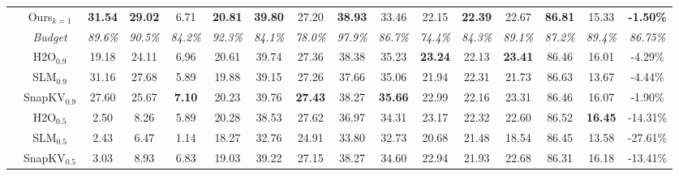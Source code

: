 \begin{table*}[!t]
{\begin{tabular}{c|ccccccccccccccc}
          & \cellcolor{teal!20}Ours$_{k=1}$                     & \cellcolor{teal!20}\textbf{31.54}&\cellcolor{teal!20}\textbf{29.02}& \cellcolor{teal!20}6.71& \cellcolor{teal!20}\textbf{20.81} & \cellcolor{teal!20}\textbf{39.80}                 & \cellcolor{teal!20}27.20              & \cellcolor{teal!20}\textbf{38.93}             &    \cellcolor{teal!20}33.46             & \cellcolor{teal!20}22.15          & \cellcolor{teal!20}\textbf{22.39}         & \cellcolor{teal!20}22.67                       &     \cellcolor{teal!20}\textbf{86.81}                    &   \cellcolor{teal!20}15.33  &\cellcolor{teal!20}\textbf{-1.50\%} \\
          & \cellcolor{pink!30}\textit{Budget}              & \cellcolor{pink!30}\textit{89.6\%} &\cellcolor{pink!30}\textit{90.5\%}&\cellcolor{pink!30}\textit{84.2\%}& \cellcolor{pink!30}\textit{92.3\%} &\cellcolor{pink!30}\textit{84.1\%}                & \cellcolor{pink!30}\textit{78.0\%}              & \cellcolor{pink!30}\textit{97.9\%}             &     \cellcolor{pink!30}\textit{86.7\%}            & \cellcolor{pink!30}\textit{74.4\%}         &\cellcolor{pink!30}\textit{84.3\%}         & \cellcolor{pink!30}\textit{89.1\%}                    &      \cellcolor{pink!30}\textit{87.2\%}          &  \cellcolor{pink!30}\textit{89.4\%}   &\cellcolor{pink!30}\textit{86.75\%} \\
          & H2O$_{0.9}$                      & 19.18  &  24.11  &   6.96 &       20.61      &   39.74  &    27.36              &  38.38                 &        35.23         &       \textbf{23.24}         & 22.13              &             \textbf{23.41}            &     86.46                       &  16.01   &-4.29\% \\
          & SLM$_{0.9}$          &        31.16     & 27.68 &   5.89       &   19.88          & 39.15  &  27.26                  &       37.66            &      35.06           &   21.94       &    22.31             &         21.73                    & 86.63   &13.67  &-4.44\%\\
          & SnapKV$_{0.9}$                   & 27.60 &  25.67   &   \textbf{7.10}     &     20.23      &  39.76 &    \textbf{27.43}                &    38.27               &       \textbf{35.66}                          &    22.99           &           22.16        &    23.31                            &   86.46        &  16.07   &-1.90\% \\ 
    & H2O$_{0.5}$  & 2.50   &8.26 & 5.89&20.28 & 38.53 & 27.62 & 36.97 & 34.31 & 23.17 & 22.32 & 22.60 & 86.52 & \textbf{16.45} & -14.31\%  \\
    & SLM$_{0.5}$  & 2.43   & 6.47 & 1.14 &18.27 & 32.76 & 24.91 & 33.80 & 32.73 & 20.68 & 21.48 & 18.54 & 86.45 & 13.58 &  -27.61\%  \\
    & SnapKV$_{0.5}$   & 3.03  & 8.93 & 6.83 &19.03 & 39.22 & 27.15 & 38.27 & 34.60 & 22.94 & 21.93 & 22.68 & 86.31 & 16.18 &-13.41\%\\ 
          

\end{tabular}}
\end{table*}
